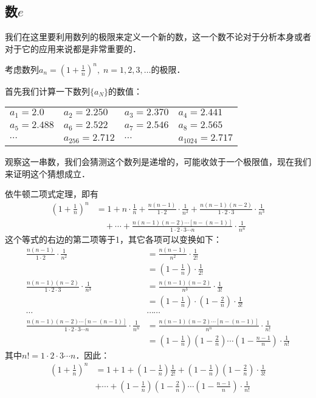 \subsection{数$e$}
我们在这里要利用数列的极限来定义一个新的数，这一个数不论对于分析本身或者对于它的应用来说都是非常重要的．

考虑数列$a_n=\left(1+\frac{1}{n}\right)^n,\; n=1, 2, 3,\ldots$的极限．

首先我们计算一下数列$\{a_N\}$的数值：
\begin{center}
\begin{tabular}{llll}
   $a_1=2.0$ & $a_2=2.250$ & $a_3=2.370$& $a_4=2.441$\\
$a_5=2.488$ &$a_6=2.522$& $a_7=2.546$& $a_8=2.565$\\
$\cdots$ &$a_{256}=2.712$&$\cdots$&$a_{1024}=2.717$\\ 
\end{tabular}
\end{center}

观察这一串数，我们会猜测这个数列是递增的，可能收敛于一个极限值，现在我们来证明这个猜想成立．

依牛顿二项式定理，即有
\[\begin{split}
    \left(1+\frac{1}{n}\right)^n&=1+n\cdot\frac{1}{n}+\frac{n(n-1)}{1\cdot 2}\cdot \frac{1}{n^2}+\frac{n(n-1)(n-2)}{1\cdot 2\cdot 3}\cdot \frac{1}{n^3}\\
    &\quad +\cdots+\frac{n(n-1)(n-2)\cdots[n-(n-1)]}{1\cdot 2\cdot 3\cdots n}\cdot \frac{1}{n^n}
\end{split}\]
这个等式的右边的第二项等于1，其它各项可以变换如下：
\[\begin{split}
\frac{n(n-1)}{1\cdot 2}\cdot \frac{1}{n^2}&=\frac{n(n-1)}{n^2}\cdot\frac{1}{2!}\\&=\left(1-\frac{1}{n}\right) \cdot\frac{1}{2!}\\
\frac{n(n-1)(n-2)}{1\cdot 2\cdot 3}\cdot \frac{1}{n^3}&=\frac{n(n-1)(n-2)}{n^3}\cdot\frac{1}{3!}\\&=\left(1-\frac{1}{n}\right)\cdot \left(1-\frac{2}{n}\right)\cdot\frac{1}{3!}\\
\cdots & \cdots\cdots\\
\frac{n(n-1)(n-2)\cdots[n-(n-1)]}{1\cdot 2\cdot 3\cdots n}\cdot \frac{1}{n^n}&=\frac{n(n-1)(n-2)\cdots[n-(n-1)]}{n^n}\cdot \frac{1}{n!}\\
&=\left(1-\frac{1}{n}\right) \left(1-\frac{2}{n}\right)\cdots\left(1-\frac{n-1}{n}\right)\cdot\frac{1}{n!}
\end{split}\]
其中$n!=1\cdot 2\cdot 3\cdots n$．因此：
\begin{equation}
\begin{split}
\left(1+\frac{1}{n}\right)^n&=1+1+\left(1-\frac{1}{n}\right)\frac{1}{2!}+ \left(1-\frac{1}{n}\right)\left(1-\frac{2}{n}\right)\cdot\frac{1}{3!}\\
&+\cdots+ \left(1-\frac{1}{n}\right) \left(1-\frac{2}{n}\right)\cdots\left(1-\frac{n-1}{n}\right)\cdot\frac{1}{n!}  
\end{split}
\end{equation}

